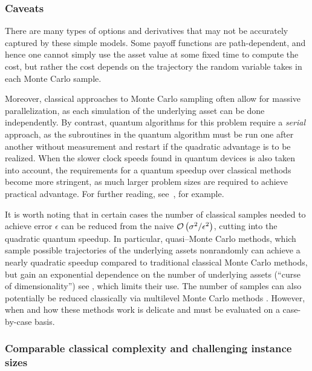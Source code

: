 \begin{refsection}

\subsubsection*{Caveats}

There are many types of options and derivatives that may not be accurately captured by these simple models. Some payoff functions are path-dependent, and hence one cannot simply use the asset value at some fixed time to compute the cost, but rather the cost depends on the trajectory the random variable takes in each Monte Carlo sample. 

Moreover, classical approaches to Monte Carlo sampling often allow for massive parallelization, as each simulation of the underlying asset can be done independently. By contrast, quantum algorithms for this problem require a \emph{serial} approach, as the subroutines in the quantum algorithm must be run one after another without measurement and restart if the quadratic advantage is to be realized. When the slower clock speeds found in quantum devices is also taken into account, the requirements for a quantum speedup over classical methods become more stringent, as much larger problem sizes are required to achieve practical advantage. For further reading, see~\cite[Sec. 2.3]{bouland2020prospects}, for example.

It is worth noting that in certain cases the number of classical samples needed to achieve error $\epsilon$ can be reduced from the naive $\mathcal{O}\left( \sigma^2/\epsilon^2 \right)$, cutting into the quadratic quantum speedup. In particular, quasi--Monte Carlo methods, which sample possible trajectories of the underlying assets nonrandomly can achieve a nearly quadratic speedup compared to traditional classical Monte Carlo methods, but gain an exponential dependence on the number of underlying assets (``curse of dimensionality'') see \cite[Chapter 5]{glasserman2004monte}, which limits their use. The number of samples can also potentially be reduced classically via multilevel Monte Carlo methods \cite{giles2015multilevelMC}. However, when and how these methods work is delicate and must be evaluated on a case-by-case basis.


\subsubsection*{Comparable classical complexity and challenging instance sizes}


\end{refsection}
